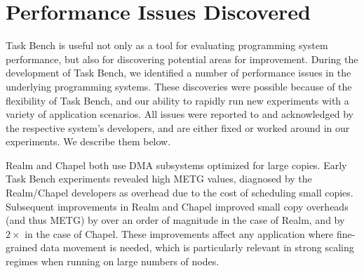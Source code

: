\section{Performance Issues Discovered}
\label{sec:case-study}

Task Bench is useful not only as a tool for evaluating programming
system performance, but also for discovering potential areas for
improvement. During the development of Task Bench, we identified a
number of performance issues in the underlying programming
systems. These discoveries were possible because of the flexibility of
Task Bench, and our ability to rapidly run new experiments with a
variety of application scenarios. All issues were reported to and
acknowledged by the respective system's developers, and are either
fixed or worked around in our experiments. We describe them below.

Realm and Chapel both use DMA subsystems optimized for large
copies. Early Task Bench experiments revealed high METG values,
diagnosed by the Realm/Chapel developers as overhead due to the
cost of scheduling small copies. Subsequent improvements in Realm and
Chapel improved small copy overheads (and thus METG) by over an order
of magnitude in the case of Realm, and by $2\times$ in the case of
Chapel. These improvements affect any application where fine-grained
data movement is needed, which is particularly relevant in strong scaling
regimes when running on large numbers of nodes.

